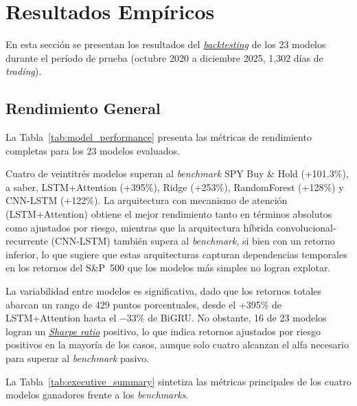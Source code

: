 
\section{Resultados Emp\'iricos}
\label{sec:empirical_results}

En esta secci\'on se presentan los resultados del \hyperlink{glos:backtesting}{\textit{backtesting}} de los 23 modelos durante el per\'iodo de prueba (octubre 2020 a diciembre 2025, 1{,}302 d\'ias de \textit{trading}).

\subsection{Rendimiento General}
\label{subsec:performance_summary}

La Tabla~\ref{tab:model_performance} presenta las m\'etricas de rendimiento completas para los 23 modelos evaluados.



Cuatro de veintitr\'es modelos superan al \textit{benchmark} SPY Buy \& Hold (+101.3\%), a saber, LSTM+Attention (+395\%), Ridge (+253\%), RandomForest (+128\%) y CNN-LSTM (+122\%). La arquitectura con mecanismo de atenci\'on (LSTM+Attention) obtiene el mejor rendimiento tanto en t\'erminos absolutos como ajustados por riesgo, mientras que la arquitectura h\'ibrida convolucional-recurrente (CNN-LSTM) tambi\'en supera al \textit{benchmark}, si bien con un retorno inferior, lo que sugiere que estas arquitecturas capturan dependencias temporales en los retornos del S\&P~500 que los modelos m\'as simples no logran explotar.

La variabilidad entre modelos es significativa, dado que los retornos totales abarcan un rango de 429 puntos porcentuales, desde el +395\% de LSTM+Attention hasta el $-$33\% de BiGRU. No obstante, 16 de 23 modelos logran un \hyperlink{glos:sharpe_ratio}{\textit{Sharpe ratio}} positivo, lo que indica retornos ajustados por riesgo positivos en la mayor\'ia de los casos, aunque solo cuatro alcanzan el alfa necesario para superar al \textit{benchmark} pasivo.

La Tabla~\ref{tab:executive_summary} sintetiza las m\'etricas principales de los cuatro modelos ganadores frente a los \textit{benchmarks}.

